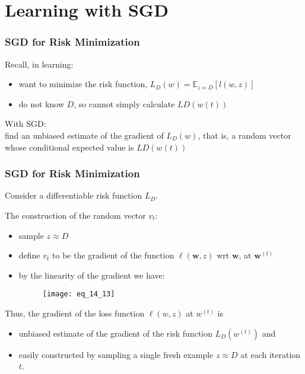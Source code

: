 \section{Learning with SGD}

\begin{frame}
\frametitle{SGD for Risk Minimization}

Recall, in learning:\\
\begin{itemize}
\item want to minimize the risk function, $L_D(w) = \mathbb{E}_{z \approx D} [l(w, z)]$
\item do not know $D$, so cannot simply calculate $LD (w(t))$
\end{itemize}

With SGD:\\
find an unbiased estimate of the gradient of $L_D(w)$, that is,
a random vector whose conditional expected value is $LD (w(t) )$

\end{frame}


\begin{frame}
\frametitle{SGD for Risk Minimization}

Consider a differentiable risk function $L_D$.

The construction of the random vector $v_t$:
\begin{itemize}
\item sample $z \approx D$
\item define $v_t$ to be the gradient of the function $\ell(\mathbf{w}, z)$ wrt $\mathbf{w}$, at $\mathbf{w}^{(t)}$
\item by the linearity of the gradient we have:
    \begin{figure}
        \centering
        \texttt{[image: eq\_14\_13]}
    \end{figure}
\end{itemize}

Thus, the gradient of the loss function $\ell(w, z)$ at $w^{(t)}$ is
\begin{itemize}
\item unbiased estimate of the gradient of the risk function $L_D( w^{(t)} )$ and
\item easily constructed by sampling a single fresh example $z \approx D$ at each iteration $t$.
\end{itemize}

\end{frame}


